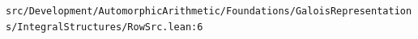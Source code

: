 \nolinkurl{src/Development/AutomorphicArithmetic/Foundations/GaloisRepresentations/IntegralStructures/RowSrc.lean:6}%
